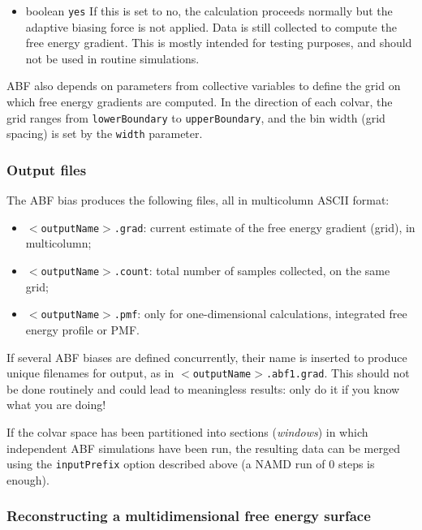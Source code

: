 \begin{itemize}
\item {}
  {boolean}
  {\texttt{yes}}
  { If this is set to no, the calculation proceeds normally but the adaptive
    biasing force is not applied. Data is still collected to compute
    the free energy gradient. This is mostly intended for testing purposes, and should
    not be used in routine simulations.
  }
\end{itemize}

ABF also depends on parameters from collective variables to define the grid on which free
energy gradients are computed. In the direction of each colvar, the grid ranges from
\texttt{lowerBoundary} to \texttt{upperBoundary}, and the bin width (grid spacing)
is set by the \texttt{width} parameter.


\subsubsection{Output files}

The ABF bias produces the following files, all in multicolumn ASCII format:
\begin{itemize}
\item \texttt{$<$outputName$>$.grad}: current estimate of the free energy gradient (grid),
  in multicolumn;
\item \texttt{$<$outputName$>$.count}: total number of samples collected, on the same grid;
\item \texttt{$<$outputName$>$.pmf}: only for one-dimensional calculations, integrated
  free energy profile or PMF.
\end{itemize}

If several ABF biases are defined concurrently, their name is inserted to produce
unique filenames for output, as in \texttt{$<$outputName$>$.abf1.grad}.
This should not be done routinely and could lead to meaningless results:
only do it if you know what you are doing!

If the colvar space has been partitioned into sections (\emph{windows}) in which independent
ABF simulations have been run, the resulting data can be merged using the
\texttt{inputPrefix} option described above (a NAMD run of 0 steps is enough).

\subsubsection{Reconstructing a multidimensional free energy surface}

